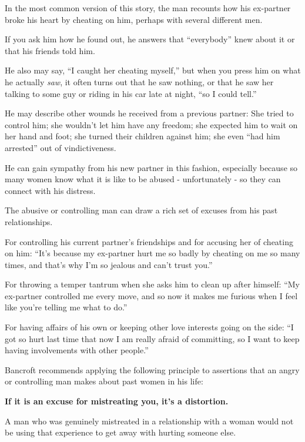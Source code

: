\documentclass[oneside]{article}
\numberwithin{equation}{section}
\begin{document}
In the most common version of this story, the man recounts how his ex-partner broke his heart by cheating on him, perhaps with several different men.

If you ask him how he found out, he answers that ``everybody'' knew about it or that his friends told him.

He also may say, ``I caught her cheating myself,'' but when you press him on what he actually \textit{saw}, it often turns out that he saw nothing, or that he saw her talking to some guy or riding in his car late at night, ``so I could tell.''

%
He may describe other wounds he received from a previous partner: She tried to control him; she wouldn't let him have any freedom; she expected him to wait on her hand and foot; she turned their children against him; she even ``had him arrested'' out of vindictiveness.


He can gain sympathy from his new partner in this fashion, especially because so many women know what it is like to be abused - unfortunately - so they can connect with his distress.

%
The abusive or controlling man can draw a rich set of excuses from his past relationships.

For controlling his current partner's friendships and for accusing her of cheating on him: ``It's because my ex-partner hurt me so badly by cheating on me so many times, and that's why I'm so jealous and can't trust you.''

For throwing a temper tantrum when she asks him to clean up after himself: ``My ex-partner controlled me every move, and so now it makes me furious when I feel like you're telling me what to do.''

For having affairs of his own or keeping other love interests going on the side: ``I got so hurt last time that now I am really afraid of committing, so I want to keep having involvements with other people.''


%
Bancroft recommends applying the following principle to assertions that an angry or controlling man makes about past women in his life:
\begin{center}
    \textbf{If it is an excuse for mistreating you, it's a distortion.}
\end{center}
A man who was genuinely mistreated in a relationship with a woman would not be using that experience to get away with hurting someone else.
\end{document}
